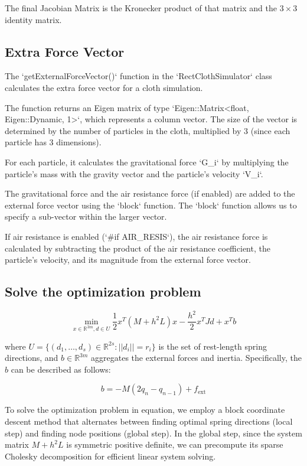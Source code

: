 \documentclass[acmtog]{acmart}
\begin{document}
The final Jacobian Matrix is the Kronecker product of that matrix and the $3\times3$ identity matrix.

\subsection{Extra Force Vector}

The `getExternalForceVector()` function in the `RectClothSimulator` class calculates the extra force vector for a cloth simulation.

The function returns an Eigen matrix of type `Eigen::Matrix<float, Eigen::Dynamic, 1>`, which represents a column vector. The size of the vector is determined by the number of particles in the cloth, multiplied by 3 (since each particle has 3 dimensions).

For each particle, it calculates the gravitational force `G\_i` by multiplying the particle's mass with the gravity vector and the particle's velocity `V\_i`.

The gravitational force and the air resistance force (if enabled) are added to the external force vector using the `block` function. The `block` function allows us to specify a sub-vector within the larger vector.

If air resistance is enabled (`\#if AIR\_RESIS`), the air resistance force is calculated by subtracting the product of the air resistance coefficient, the particle's velocity, and its magnitude from the external force vector.

\subsection{Solve the optimization problem}

\begin{equation}
    \min_{x \in \mathbb{R}^{3m}, d \in U} \frac{1}{2} x^T (M + h^2 L) x - \frac{h^2}{2} x^T Jd + x^T b
\end{equation}

where $U = \{(d_1, \ldots, d_s) \in \mathbb{R}^{2s} : ||d_i|| = r_i\}$ is the set of rest-length spring directions, and $b \in \mathbb{R}^{3m}$ aggregates the external forces and inertia. Specifically, the $b$ can be described as follows:

\[
    b = -M(2q_n - q_{n-1}) + f_{\text{ext}}
\]

To solve the optimization problem in equation, we employ a block coordinate descent method that alternates between finding optimal spring directions (local step) and finding node positions (global step). In the global step, since the system matrix $M + h^2L$ is symmetric positive definite, we can precompute its sparse Cholesky decomposition for efficient linear system solving.
\end{document}
